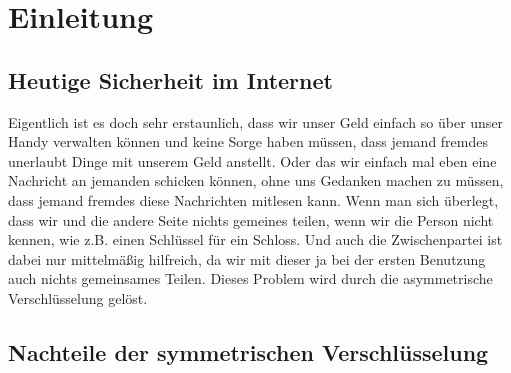 \documentclass[14pt,a4paper]{scrartcl}
\begin{document}
	
\thispagestyle{empty}
\tableofcontents
\thispagestyle{empty}


\pagebreak
\section{Einleitung}
\subsection{Heutige Sicherheit im Internet}
Eigentlich ist es doch sehr erstaunlich, dass wir unser Geld einfach so über unser Handy verwalten können und keine Sorge haben müssen, dass jemand fremdes unerlaubt Dinge mit unserem Geld anstellt. Oder das wir einfach mal eben eine Nachricht an jemanden schicken können, ohne uns Gedanken machen zu müssen, dass jemand fremdes diese Nachrichten mitlesen kann. Wenn man sich überlegt, dass wir und die andere Seite nichts gemeines teilen, wenn wir die Person nicht kennen, wie z.B. einen Schlüssel für ein Schloss. Und auch die Zwischenpartei ist dabei nur mittelmäßig hilfreich, da wir mit dieser ja bei der ersten Benutzung auch nichts gemeinsames Teilen. Dieses Problem wird durch die asymmetrische Verschlüsselung gelöst.
\subsection{Nachteile der symmetrischen Verschlüsselung}
\end{document}
